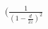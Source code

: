 \documentclass[preview]{standalone}
\begin{document}
\begin{align*}
\big(\frac{1}{(1 - \frac{d}{2z})^{2}}
\end{align*}
\end{document}
